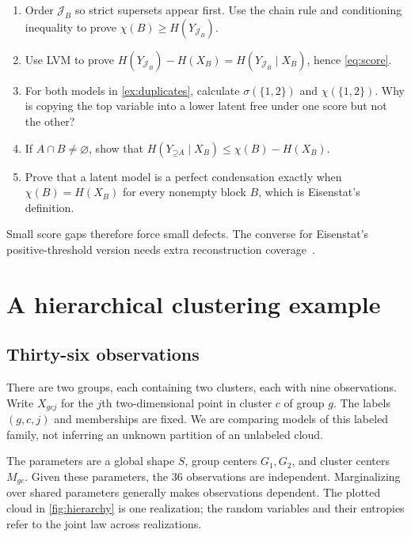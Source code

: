 \documentclass[11pt]{article}
\newcommand{\Up}{\mathord{\supseteq}}
\begin{document}
\begin{exercise}
\label{ex:scores}
\begin{enumerate}
\item Order $\mathcal{J}_B$ so strict supersets appear first. Use the chain rule
and conditioning inequality to prove $\chi(B)\ge H(Y_{\mathcal{J}_B})$.
\item Use LVM to prove
$H(Y_{\mathcal{J}_B})-H(X_B)=H(Y_{\mathcal{J}_B}\mid X_B)$, hence
\eqref{eq:score}.
\item For both models in \cref{ex:duplicates}, calculate $\sigma(\{1,2\})$ and
$\chi(\{1,2\})$. Why is copying the top variable into a lower latent free
under one score but not the other?
\item If $A\cap B\ne\varnothing$, show that
$H(Y_{\Up A}\mid X_B)\le\chi(B)-H(X_B)$.
\item Prove that a latent model is a perfect condensation exactly when
$\chi(B)=H(X_B)$ for every nonempty block $B$, which is Eisenstat's definition.
\end{enumerate}
\end{exercise}

Small score gaps therefore force small defects. The converse for Eisenstat's
positive-threshold version needs extra reconstruction
coverage~\citep{benson2026relating}.

\section{A hierarchical clustering example}
\label{sec:clustering}
\subsection{Thirty-six observations}
There are two groups, each containing two clusters, each with nine observations.
Write $X_{gcj}$ for the $j$th two-dimensional point in cluster $c$ of group $g$.
The labels $(g,c,j)$ and memberships are fixed. We are comparing models of this
labeled family, not inferring an unknown partition of an unlabeled cloud.

The parameters are a global shape $S$, group centers $G_1,G_2$, and cluster
centers $M_{gc}$. Given these parameters, the 36 observations are independent.
Marginalizing over shared parameters generally makes observations dependent.
The plotted cloud in \cref{fig:hierarchy} is one realization; the random variables and their entropies
refer to the joint law across realizations.
\end{document}
